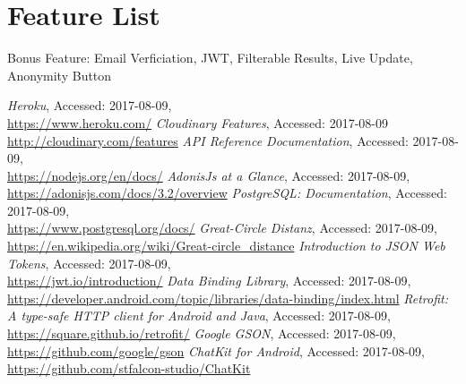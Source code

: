\documentclass[11pt, accentcolor=tud1c]{tudreport}
\begin{document}
\chapter{Feature List}\label{ch:feature_list}
Bonus Feature: Email Verficiation, JWT, Filterable Results, Live Update, Anonymity Button
\begin{thebibliography}{9}
		\textit{Heroku}, 
		Accessed: 2017-08-09, \\
		\url{https://www.heroku.com/}
		\textit{Cloudinary Features}, 
		Accessed: 2017-08-09 \\
		\url{http://cloudinary.com/features}
		\textit{API Reference Documentation}, 
		Accessed: 2017-08-09, \\
		\url{https://nodejs.org/en/docs/}
		\textit{AdonisJs at a Glance}, 
		Accessed: 2017-08-09, \\
		\url{https://adonisjs.com/docs/3.2/overview}
		\textit{PostgreSQL: Documentation}, 
		Accessed: 2017-08-09, \\
		\url{https://www.postgresql.org/docs/}
		\textit{Great-Circle Distanz}, 
		Accessed: 2017-08-09, \\
		\url{https://en.wikipedia.org/wiki/Great-circle_distance}
		\textit{Introduction to JSON Web Tokens}, 
		Accessed: 2017-08-09, \\
		\url{https://jwt.io/introduction/}
		\textit{Data Binding Library}, 
		Accessed: 2017-08-09, \\
		\url{https://developer.android.com/topic/libraries/data-binding/index.html}
		\textit{Retrofit: A type-safe HTTP client for Android and Java}, 
		Accessed: 2017-08-09, \\	
		\url{https://square.github.io/retrofit/}
		\textit{Google GSON}, 
		Accessed: 2017-08-09, \\
		\url{https://github.com/google/gson}
		\textit{ChatKit for Android}, 
		Accessed: 2017-08-09, \\
		\url{https://github.com/stfalcon-studio/ChatKit}
\end{thebibliography}
\end{document}
